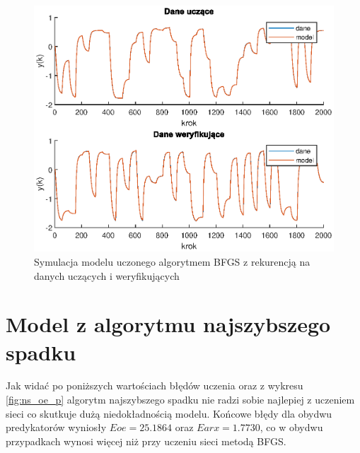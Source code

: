 		\begin{figure}[h!]
			\centering
			\includegraphics[width=\linewidth]{img/BFGS_OE_d.eps}
			\caption{Symulacja modelu uczonego algorytmem BFGS z rekurencją na danych uczących i weryfikujących}
			\label{fig:bfgs_oe_d}
		\end{figure}
		
		\newpage
	\section{Model z algorytmu najszybszego spadku}
		\label{sec:naj_sp}
		Jak widać po poniższych wartościach błędów uczenia oraz z wykresu \ref{fig:ns_oe_p} algorytm najszybszego spadku nie radzi sobie najlepiej z uczeniem sieci co skutkuje dużą niedokładnością modelu. Końcowe błędy dla obydwu predykatorów wyniosły $Eoe = 25.1864$ oraz $Earx = 1.7730$, co w obydwu przypadkach wynosi więcej niż przy uczeniu sieci metodą BFGS.
		
